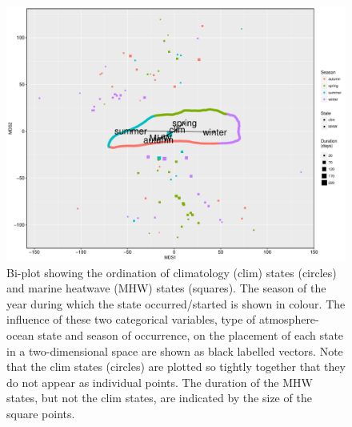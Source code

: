\documentclass[utf8]{frontiersSCNS}
\begin{document}
\begin{figure}[]
\begin{center}
\includegraphics[width=1.0\textwidth]{figure_3.pdf}
\end{center}
\caption{Bi-plot showing the ordination of climatology (clim) states (circles) and marine heatwave (MHW) states (squares). The season of the year during which the state occurred/started is shown in colour. The influence of these two categorical variables, type of atmosphere-ocean state and season of occurrence, on the placement of each state in a two-dimensional space are shown as black labelled vectors. Note that the clim states (circles) are plotted so tightly together that they do not appear as individual points. The duration of the MHW states, but not the clim states, are indicated by the size of the square points.}
\label{figure3}
\end{figure}
\end{document}
